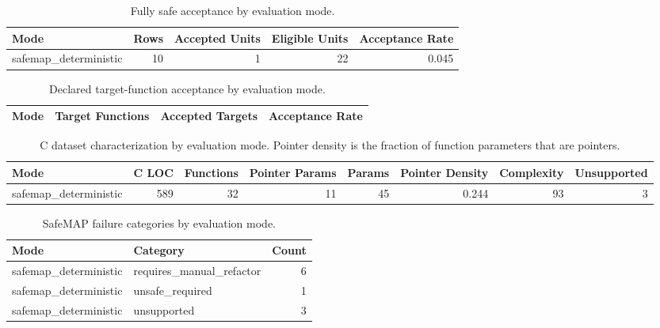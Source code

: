 \begin{table}[t]
\centering
\caption{Fully safe acceptance by evaluation mode.}
\label{tab:safemap-mode-summary}
\begin{tabular}{lrrrr}
\hline
Mode & Rows & Accepted Units & Eligible Units & Acceptance Rate \\
\hline
safemap\_deterministic & 10 & 1 & 22 & 0.045 \\
\hline
\end{tabular}
\end{table}

\begin{table}[t]
\centering
\caption{Declared target-function acceptance by evaluation mode.}
\label{tab:safemap-target-summary}
\begin{tabular}{lrrr}
\hline
Mode & Target Functions & Accepted Targets & Acceptance Rate \\
\hline
\hline
\end{tabular}
\end{table}

\begin{table}[t]
\centering
\caption{C dataset characterization by evaluation mode. Pointer density is the fraction of function parameters that are pointers.}
\label{tab:safemap-dataset-characterization}
\begin{tabular}{lrrrrrrr}
\hline
Mode & C LOC & Functions & Pointer Params & Params & Pointer Density & Complexity & Unsupported \\
\hline
safemap\_deterministic & 589 & 32 & 11 & 45 & 0.244 & 93 & 3 \\
\hline
\end{tabular}
\end{table}

\begin{table}[t]
\centering
\caption{SafeMAP failure categories by evaluation mode.}
\label{tab:safemap-failure-summary}
\begin{tabular}{llr}
\hline
Mode & Category & Count \\
\hline
safemap\_deterministic & requires\_manual\_refactor & 6 \\
safemap\_deterministic & unsafe\_required & 1 \\
safemap\_deterministic & unsupported & 3 \\
\hline
\end{tabular}
\end{table}

